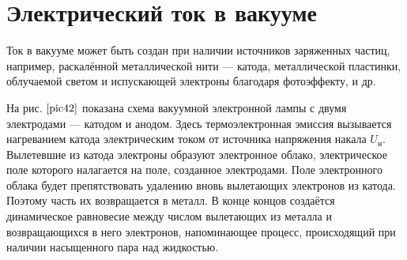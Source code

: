 \documentclass[a4paper,10pt]{book}
\begin{document}
\section{Электрический ток в вакууме}
Ток в вакууме может быть создан при наличии источников заряженных частиц, например, раскалённой металлической нити — катода, металлической пластинки, облучаемой светом и испускающей электроны благодаря фотоэффекту, и др.

\begin{figure}[h]
\caption{}
\label{pic42}
\end{figure}

На рис. $\ref{pic42}$ показана схема вакуумной электронной лампы с двумя электродами — катодом и анодом. Здесь термоэлектронная эмиссия вызывается нагреванием катода электрическим током от источника напряжения накала $U_\text{н}$. Вылетевшие из катода электроны образуют электронное облако, электрическое поле которого налагается на поле, созданное электродами. Поле электронного облака будет препятствовать удалению вновь вылетающих электронов из катода. Поэтому часть их возвращается в металл. В конце концов создаётся динамическое равновесие между числом вылетающих из металла и возвращающихся в него электронов, напоминающее процесс, происходящий при наличии насыщенного пара над жидкостью.
\end{document}
